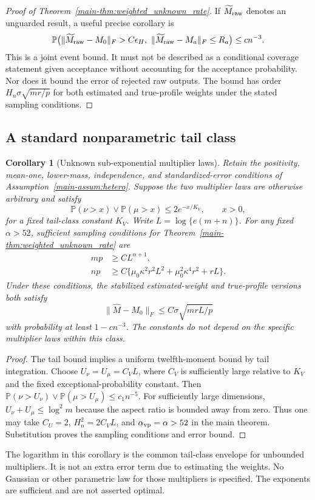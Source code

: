 \documentclass[numsec,webpdf,modern,large,namedate]{oup-authoring-template}
\theoremstyle{plain}
\newtheorem{scorollary}{Corollary}%
\theoremstyle{remark}
\newif\ifmarkchanges
\newenvironment{revision}{\begingroup\ifmarkchanges\color{red}\fi}{\endgroup}
\begin{document}
\begin{revision}
\begin{proof}[Proof of Theorem~\ref{main-thm:weighted_unknown_rate}]
If $\widetilde M_{\rm raw}$ denotes an unguarded result, a useful precise
corollary is
\begin{align}
 \mathbb P\bigl(\|\widetilde M_{\rm raw}-M_0\|_F>C\epsilon_H,
      \ \|\widetilde M_{\rm raw}-M_a\|_F\le R_a\bigr)
 \le cn^{-3}.
 \label{eq:wc_raw_joint_certificate}
\end{align}
This is a joint event bound. It must not be described as a conditional
coverage statement given acceptance without accounting for the
acceptance probability. Nor does it bound the error of rejected raw
outputs. The bound has order $H_n\sigma\sqrt{mr/p}$ for both estimated and true-profile weights under the stated sampling conditions.
\end{proof}

\subsection{A standard nonparametric tail class}
\begin{scorollary}[Unknown sub-exponential multiplier laws]
\label{cor:wc_standard_tail_class}
Retain the positivity, mean-one, lower-mass, independence, and
standardized-error conditions of Assumption~\ref{main-assum:hetero}.
Suppose the two multiplier laws are otherwise arbitrary and satisfy
\[
 \mathbb P(\nu>x)\vee\mathbb P(\mu>x)\le2e^{-x/K_V},\qquad x>0,
\]
for a fixed tail-class constant $K_V$. Write $L=\log\{e(m+n)\}$.
For any fixed $\alpha>52$, sufficient sampling conditions for
Theorem~\ref{main-thm:weighted_unknown_rate} are
\begin{align*}
 mp&\ge C L^{\alpha+1},\\
 np&\ge C\{\mu_0\kappa^2r^2L^2+
                  \mu_0^2\kappa^4r^2+rL\}.
\end{align*}
Under these conditions, the stabilized estimated-weight and true-profile
versions both satisfy
\[
 \|\widehat M-M_0\|_F\le C\sigma\sqrt{mrL/p}
\]
with probability at least $1-cn^{-3}$. The constants do not depend on the
specific multiplier laws within this class.
\end{scorollary}
\begin{proof}
The tail bound implies a uniform twelfth-moment bound by tail
integration. Choose $U_\nu=U_\mu=C_VL$, where $C_V$ is sufficiently large
relative to $K_V$ and the fixed exceptional-probability constant. Then
$\mathbb P(\nu>U_\nu)\vee\mathbb P(\mu>U_\mu)\le c_1n^{-5}$.
For sufficiently large dimensions, $U_\nu+U_\mu\le\log^2m$ because the
aspect ratio is bounded away from zero. Thus one may take $C_U=2$,
$H_n^2=2C_VL$, and $\alpha_{\rm vp}=\alpha>52$ in the main theorem.
Substitution proves the sampling conditions and error bound.
\end{proof}
The logarithm in this corollary is the common tail-class envelope for
unbounded multipliers. It is not an extra error term due to estimating
the weights. No Gaussian or other parametric law for those multipliers
is specified. The exponents are sufficient and are not asserted optimal.


\end{revision}
\end{document}
